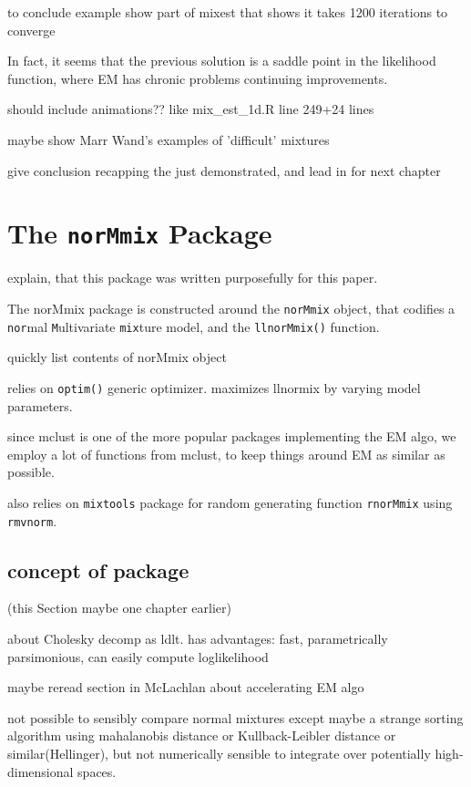 to conclude example show part of mixest that shows it takes 1200 iterations to converge

In fact, it seems that the previous solution is a saddle point in the likelihood function, where EM has chronic problems continuing improvements.

should include animations?? like mix\_est\_1d.R line 249+24 lines

maybe show Marr Wand's examples of 'difficult' mixtures

give conclusion recapping the just demonstrated, and lead in for next chapter






\chapter{The {\tt norMmix} Package}

explain, that this package was written purposefully for this paper.

The norMmix package is constructed around the {\tt norMmix} object, that codifies a {\tt nor}mal {\tt M}ultivariate {\tt mix}ture model,  and the {\tt llnorMmix()} function.

quickly list contents of norMmix object

relies on {\tt optim()} generic optimizer. maximizes llnormix by varying model parameters.

since mclust is one of the more popular packages implementing the EM algo, we employ a lot of functions from mclust, to keep things around EM as similar as possible.

also relies on {\tt mixtools} package for random generating function {\tt rnorMmix} using {\tt rmvnorm}.

\section{concept of package} (this Section maybe one chapter earlier)

about Cholesky decomp as ldlt. has advantages: fast, parametrically parsimonious, can easily compute loglikelihood

maybe reread section in McLachlan about accelerating EM algo

not possible to sensibly compare normal mixtures except maybe a strange sorting algorithm using mahalanobis distance or Kullback-Leibler distance or similar(Hellinger), but not numerically sensible to integrate over potentially high-dimensional spaces.


